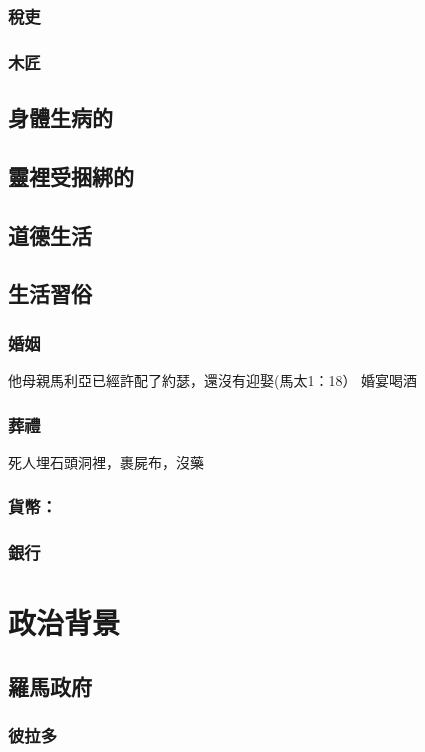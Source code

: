\subsubsection{稅吏}
\subsubsection{木匠}


\subsection{身體生病的}
\subsection{靈裡受捆綁的}
\subsection{道德生活}

\subsection{生活習俗}
\subsubsection{婚姻}
他母親馬利亞已經許配了約瑟，還沒有迎娶(馬太1：18）
婚宴喝酒
\subsubsection{葬禮}
死人埋石頭洞裡，裹屍布，沒藥
\subsubsection{貨幣：}

\subsubsection{銀行}


\section{政治背景}
\subsection{羅馬政府}
\subsubsection{彼拉多}
